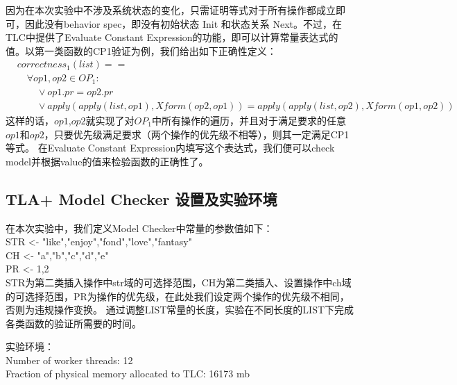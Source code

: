 因为在本次实验中不涉及系统状态的变化，只需证明等式对于所有操作都成立即可，因此没有behavior spec，即没有初始状态 Init 和状态关系 Next。不过，在TLC中提供了Evaluate Constant Expression的功能，即可以计算常量表达式的值。以第一类函数的CP1验证为例，我们给出如下正确性定义：
\begin{align*}
 & correctness_1 (list) ==\\
 & \quad \forall op1,op2 \in OP_1:\\
 & \quad \quad \lor op1.pr = op2.pr\\
 & \quad \quad \lor apply(apply(list,op1),Xform(op2, op1)) = apply(apply(list,op2),Xform(op1, op2))  
\end{align*}
这样的话，$op1$,$op2$就实现了对$OP_1$中所有操作的遍历，并且对于满足要求的任意$op1$和$op2$，只要优先级满足要求（两个操作的优先级不相等），则其一定满足CP1等式。
在Evaluate Constant Expression内填写这个表达式，我们便可以check model并根据value的值来检验函数的正确性了。

\subsection{TLA+ Model Checker 设置及实验环境}
在本次实验中，我们定义Model Checker中常量的参数值如下：\\
STR <- {"like","enjoy","fond","love","fantasy"} \\
CH <- {"a","b","c","d","e"}\\
PR <- {1,2}\\
STR为第二类插入操作中str域的可选择范围，CH为第二类插入、设置操作中ch域的可选择范围，PR为操作的优先级，在此处我们设定两个操作的优先级不相同，否则为违规操作变换。
通过调整LIST常量的长度，实验在不同长度的LIST下完成各类函数的验证所需要的时间。

实验环境：\\
Number of worker threads: 12\\
Fraction of physical memory allocated to TLC: 16173 mb

